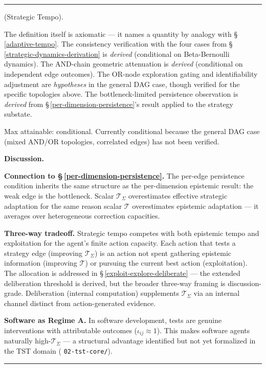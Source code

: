 \documentclass[11pt,oneside]{article}
\newcounter{claim}[section]
\renewcommand{\theclaim}{\thesection.\arabic{claim}}
\newenvironment{segment}[2]{%
  \refstepcounter{claim}%
  \bigskip\noindent\hrule\smallskip
  \noindent{\bfseries #1~\theclaim}\enskip(#2).\par\smallskip
  \noindent\ignorespaces
}{%
  \par\smallskip\noindent\hrule\bigskip
}
\newenvironment{definition}[1][]{\begin{segment}{Definition}{#1}}{\end{segment}}
\begin{document}
\begin{definition}[Strategic Tempo]
The definition itself is axiomatic --- it names a quantity by analogy with \S\,\ref{adaptive-tempo}. The consistency verification with the four cases from \S\,\ref{strategic-dynamics-derivation} is \textit{derived} (conditional on Beta-Bernoulli dynamics). The AND-chain geometric attenuation is \textit{derived} (conditional on independent edge outcomes). The OR-node exploration gating and identifiability adjustment are \textit{hypotheses} in the general DAG case, though verified for the specific topologies above. The bottleneck-limited persistence observation is \textit{derived} from \S\,\ref{per-dimension-persistence}'s result applied to the strategy substate.

Max attainable: conditional. Currently conditional because the general DAG case (mixed AND/OR topologies, correlated edges) has not been verified.


\medskip\noindent\textbf{Discussion.}


\textbf{Connection to \S\,\ref{per-dimension-persistence}.} The per-edge persistence condition inherits the same structure as the per-dimension epistemic result: the weak edge is the bottleneck. Scalar $\mathcal T_\Sigma$ overestimates effective strategic adaptation for the same reason scalar $\mathcal T$ overestimates epistemic adaptation --- it averages over heterogeneous correction capacities.

\textbf{Three-way tradeoff.} Strategic tempo competes with both epistemic tempo and exploitation for the agent's finite action capacity. Each action that tests a strategy edge (improving $\mathcal T_\Sigma$) is an action not spent gathering epistemic information (improving $\mathcal T$) or pursuing the current best action (exploitation). The allocation is addressed in \S\,\ref{exploit-explore-deliberate} — the extended deliberation threshold is derived, but the broader three-way framing is discussion-grade. Deliberation (internal computation) supplements $\mathcal T_\Sigma$ via an internal channel distinct from action-generated evidence.

\textbf{Software as Regime A.} In software development, tests are genuine interventions with attributable outcomes ($\iota_{ij} \approx 1$). This makes software agents naturally high-$\mathcal T_\Sigma$ --- a structural advantage identified but not yet formalized in the TST domain ( \texttt{02-tst-core/}).

\end{definition}
\end{document}
